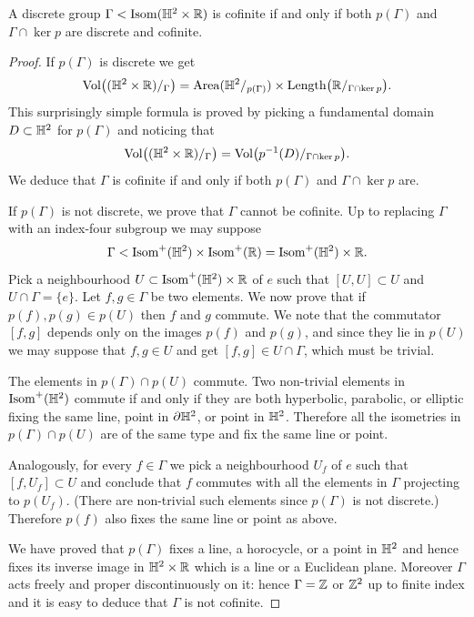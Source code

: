 \begin{prop} \label{H2R:prop}
A discrete group $\Gamma < {\rm Isom}(\mathbb{H}^2 \times \mathbb{R})$ is cofinite if and only if both $p(\Gamma)$ and $\Gamma \cap \ker p$ are discrete and cofinite.
\end{prop}
\begin{proof} 
If $p(\Gamma)$ is discrete we get
\begin{equation} \label{volume:product:eqn}
{\rm Vol} \big((\mathbb{H}^2\times \mathbb{R})/_\Gamma \big) = {\rm Area}(\mathbb{H}^2/_{p(\Gamma)}) \times {\rm Length}\big(\mathbb{R}/ _{\Gamma \cap \ker p}\big). 
\end{equation}
This surprisingly simple formula is proved by picking a fundamental domain $D\subset \mathbb{H}^2$ for $p(\Gamma)$ and noticing that 
$${\rm Vol} \big((\mathbb{H}^2\times \mathbb{R})/_\Gamma \big) = {\rm Vol}\big(p^{-1}(D)/_{\Gamma \cap \ker p}\big).$$ 
We deduce that $\Gamma$ is cofinite if and only if both $p(\Gamma)$ and $\Gamma \cap \ker p$ are. 

If $p(\Gamma)$ is not discrete, we prove that $\Gamma$ cannot be cofinite. Up to replacing $\Gamma$ with an index-four subgroup we may suppose 
$$\Gamma < {\rm Isom}^+(\mathbb{H}^2) \times {\rm Isom}^+(\mathbb{R}) = {\rm Isom}^+(\mathbb{H}^2) \times \mathbb{R}.$$
Pick a neighbourhood $U\subset {\rm Isom}^+(\mathbb{H}^2) \times \mathbb{R}$ of $e$ such that $[U,U] \subset U$ and $U\cap\Gamma = \{e\}$. Let $f,g \in \Gamma$ be two elements. 
We now prove that if $p(f), p(g) \in p(U)$ then $f$ and $g$ commute.
We note that the commutator $[f,g]$ depends only on the images $p(f)$ and $p(g)$, and since they lie in $p(U)$ we may suppose that $f,g\in U$ and get $[f,g]\in U\cap \Gamma$, which must be trivial.

The elements in $p(\Gamma)\cap p(U)$ commute. Two non-trivial elements in ${\rm Isom}^+(\mathbb{H}^2)$ commute if and only if they are both hyperbolic, parabolic, or elliptic fixing the same line, point in $\partial \mathbb{H}^2$, or point in $\mathbb{H}^2$. Therefore all the isometries in $p(\Gamma)\cap p(U)$ are of the same type and fix the same line or point.

Analogously, for every $f \in \Gamma$ we pick a neighbourhood $U_f$ of $e$ such that $[f, U_f] \subset U$ and conclude that $f$ commutes with all the elements in $\Gamma $ projecting to $p(U_f)$. (There are non-trivial such elements since $p(\Gamma)$ is not discrete.) Therefore $p(f)$ also fixes the same line or point as above.

We have proved that $p(\Gamma)$ fixes a line, a horocycle, or a point in $\mathbb{H}^2$ and hence fixes its inverse image in $\mathbb{H}^2 \times \mathbb{R}$ which is a line or a Euclidean plane. Moreover $\Gamma$ acts freely and proper discontinuously on it: hence $\Gamma =\mathbb{Z}$ or $\mathbb{Z}^2$ up to finite index and it is easy to deduce that $\Gamma$ is not cofinite.
\end{proof}

